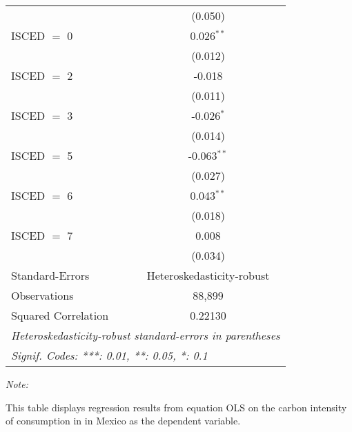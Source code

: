 \begin{table}[htbp!]
\begin{adjustbox}{width = 1\textwidth, max height = 0.95\textheight, center}
\begin{threeparttable}[b]
\begin{tabular}{lc}
                                & (0.050)\\   
            ISCED $=$ 0         & 0.026$^{**}$\\   
                                & (0.012)\\   
            ISCED $=$ 2         & -0.018\\   
                                & (0.011)\\   
            ISCED $=$ 3         & -0.026$^{*}$\\   
                                & (0.014)\\   
            ISCED $=$ 5         & -0.063$^{**}$\\   
                                & (0.027)\\   
            ISCED $=$ 6         & 0.043$^{**}$\\   
                                & (0.018)\\   
            ISCED $=$ 7         & 0.008\\   
                                & (0.034)\\   
            \midrule 
            Standard-Errors     & Heteroskedasticity-robust \\   
            Observations        & 88,899\\  
            Squared Correlation & 0.22130\\  
            \midrule \midrule
            \multicolumn{2}{l}{\emph{Heteroskedasticity-robust standard-errors in parentheses}}\\
            \multicolumn{2}{l}{\emph{Signif. Codes: ***: 0.01, **: 0.05, *: 0.1}}\\
         \end{tabular}
         
         \begin{tablenotes}\item \medskip \textit{Note:}
            \item This table displays regression results from equation OLS on the carbon intensity of consumption in  in Mexico as the dependent variable. 
         \end{tablenotes}
      \end{threeparttable}
   \end{adjustbox}
\end{table}



